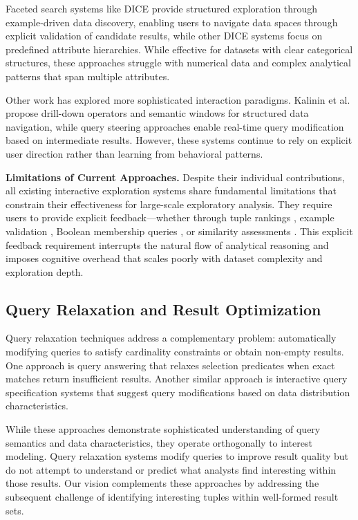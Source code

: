 \documentclass[sigconf, nonacm]{acmart}
\begin{document}
Faceted search systems like DICE \cite{rezig2021dice} provide structured exploration through example-driven data discovery, enabling users to navigate data spaces through explicit validation of candidate results, while other DICE systems \cite{el2016dice} focus on predefined attribute hierarchies. While effective for datasets with clear categorical structures, these approaches struggle with numerical data and complex analytical patterns that span multiple attributes.

Other work has explored more sophisticated interaction paradigms. Kalinin et al. \cite{kalininInteractiveDataExploration2014} propose drill-down operators and semantic windows for structured data navigation, while query steering approaches \cite{ugurcetintemelQuerySteeringInteractive2013} enable real-time query modification based on intermediate results. However, these systems continue to rely on explicit user direction rather than learning from behavioral patterns.

\textbf{Limitations of Current Approaches.} Despite their individual contributions, all existing interactive exploration systems share fundamental limitations that constrain their effectiveness for large-scale exploratory analysis. They require users to provide explicit feedback—whether through tuple rankings \cite{dimitriadouAIDEActiveLearningBased2016}, example validation \cite{rezig2021dice}, Boolean membership queries \cite{bonifati2014interactive}, or similarity assessments \cite{mottin2014exemplar}. This explicit feedback requirement interrupts the natural flow of analytical reasoning and imposes cognitive overhead that scales poorly with dataset complexity and exploration depth.

\subsection{Query Relaxation and Result Optimization}

Query relaxation techniques address a complementary problem: automatically modifying queries to satisfy cardinality constraints or obtain non-empty results. One approach is query answering \cite{lim2013flexible} that relaxes selection predicates when exact matches return insufficient results. Another similar approach is interactive query specification systems \cite{mishra2009interactive} that suggest query modifications based on data distribution characteristics.

While these approaches demonstrate sophisticated understanding of query semantics and data characteristics, they operate orthogonally to interest modeling. Query relaxation systems modify queries to improve result quality but do not attempt to understand or predict what analysts find interesting within those results. Our vision complements these approaches by addressing the subsequent challenge of identifying interesting tuples within well-formed result sets.
\end{document}
